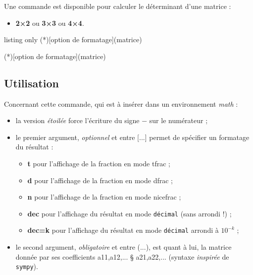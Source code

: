 \documentclass[french,a4paper,11pt]{article}
\newcommand\Cle[1]{{\bfseries\sffamily\textlangle #1\textrangle}}
\newcommand\cmaj[1]{\tcbox[vignetteMaJ]{#1}\xspace}
\begin{document}
\begin{cautionblock}
Une commande est disponible pour calculer le déterminant d'une matrice :

\begin{itemize}
	\item \textbf{2×2} ou \textbf{3×3} ou \textbf{4×4}.
\end{itemize}
\vspace*{-\baselineskip}\leavevmode
\end{cautionblock}

\begin{PresentationCode}{listing only}
\DetMatrice(*)[option de formatage](matrice)

\DetMatricePY(*)[option de formatage](matrice)
\end{PresentationCode}

\subsection{Utilisation}

\begin{tipblock}
Concernant cette commande, qui est à insérer dans un environnement \textit{math} :

\begin{itemize}
	\item \cmaj{0.1.3} la version \textit{étoilée} force l'écriture du signe \og $-$ \fg{} sur le numérateur ;
	\item le premier argument, \textit{optionnel} et entre \textsf{[...]} permet de spécifier un formatage du résultat :
	\begin{itemize}
		\item \Cle{t} pour l'affichage de la fraction en mode \textsf{tfrac} ;
		\item \Cle{d} pour l'affichage de la fraction en mode \textsf{dfrac} ;
		\item \Cle{n} pour l'affichage de la fraction en mode \textsf{nicefrac} ;
		\item \Cle{dec} pour l'affichage du résultat en mode \texttt{décimal} (sans arrondi !) ;
		\item \Cle{dec=k} pour l'affichage du résultat en mode \texttt{décimal} arrondi à $10^{-k}$ ;
	\end{itemize}
	\item le second argument, \textit{obligatoire} et entre \textsf{(...)}, est quant à lui, la matrice donnée par ses coefficients \textsf{a11,a12,... § a21,a22,...} (syntaxe \textit{inspirée} de \texttt{sympy}).
\end{itemize}
\vspace*{-\baselineskip}\leavevmode
\end{tipblock}
\end{document}
